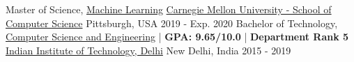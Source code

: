 

\begin{cventries}
  \cventry
    {Master of Science, \href{https://www.ml.cmu.edu/academics/ms-curriculum.html} {Machine Learning} } %
    {\href{https://www.cmu.edu/}{Carnegie Mellon University - School of Computer Science}} %
    {Pittsburgh, USA} %
    {2019 - Exp. 2020} %
    {}
\vspace{-.5\baselineskip}
  \cventry
    {Bachelor of Technology, \href{http://www.cse.iitd.ac.in/} {Computer Science and Engineering} | \textbf{GPA: 9.65/10.0} | \textbf{Department Rank 5} } %
    {\href{http://www.iitd.ac.in/}{Indian Institute of Technology, Delhi}} %
    {New Delhi, India} %
    {2015 - 2019} %
    {
    }


\end{cventries}
